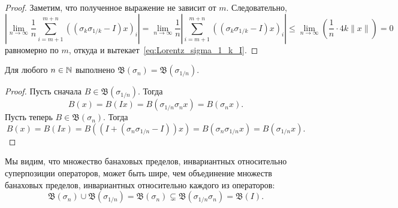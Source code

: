 \begin{proof}
	Заметим, что полученное выражение не зависит от $m$.
	Следовательно,
	\begin{equation}
		\left|\lim_{n\to\infty} \frac{1}{n} \sum_{i=m+1}^{m+n} ((\sigma_k \sigma_{1/k} - I)x)_i\right|
		=
		\lim_{n\to\infty} \frac{1}{n} \left|\sum_{i=m+1}^{m+n} ((\sigma_k \sigma_{1/k} - I)x)_i\right|
		\leq
		\lim_{n\to\infty} \left( \frac{1}{n} \cdot 4k \|x\|\right)
		= 0
	\end{equation}
	равномерно по $m$,
	откуда и вытекает~\eqref{eq:Lorentz_sigma_1_k_I}.

\end{proof}

\begin{theorem}
	\label{thm:B_sigma_n_eq_B_sigma_1_n}
	Для любого $n\in\mathbb{N}$ выполнено $\mathfrak{B}(\sigma_n) = \mathfrak{B}(\sigma_{1/n})$.
\end{theorem}

\begin{proof}
	Пусть сначала $B \in \mathfrak{B}(\sigma_{1/n})$.
	Тогда
	\begin{equation}
		B(x) = B(Ix) = B(\sigma_{1/n} \sigma_n x) = B(\sigma_n x)
		.
	\end{equation}
	Пусть теперь $B \in \mathfrak{B}(\sigma_n)$.
	Тогда
	\begin{equation}
		B(x) = B(Ix) = B((I+(\sigma_n \sigma_{1/n} - I)) x) = B(\sigma_n \sigma_{1/n} x) = B(\sigma_{1/n} x)
		.
	\end{equation}
\end{proof}

\begin{remark}
	Мы видим, что множество банаховых пределов, инвариантных относительно суперпозиции операторов,
	может быть шире, чем объединение множеств банаховых пределов,
	инвариантных относительно каждого из операторов:
	\begin{equation}
		\mathfrak{B}(\sigma_n) \cup \mathfrak{B}(\sigma_{1/n}) = \mathfrak{B}(\sigma_n) \subsetneq \mathfrak{B}(\sigma_{1/n}\sigma_n) = \mathfrak{B}(I)
		.
	\end{equation}
\end{remark}
